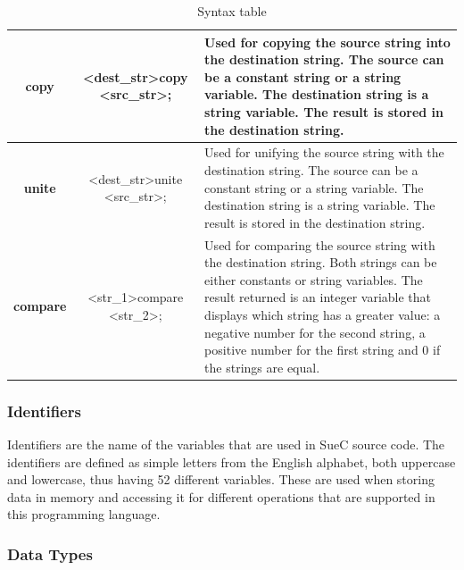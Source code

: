 \documentclass[12pt,a4paper,twoside]{report}
\begin{document}
\begin{table}[H]
\begin{tabular}{|c|c|p{8cm}|}
\textbf{copy}             & \textless{}dest\_str\textgreater copy \textless{}src\_str\textgreater{};                                                                                                  & Used for copying the source string into the destination string. The source can be a constant string or a string variable. The destination string is a string variable. The result is stored in the destination string.                                                                                                                 \\ \hline
\textbf{unite}            & \textless{}dest\_str\textgreater unite \textless{}src\_str\textgreater{};                                                                                                 & Used for unifying the source string with the destination string. The source can be a constant string or a string variable. The destination string is a string variable. The result is stored in the destination string.                                                                                                                \\ \hline
\textbf{compare}          & \textless{}str\_1\textgreater compare \textless{}str\_2\textgreater{};                                                                                                      & Used for comparing the source string with the destination string. Both strings can be either constants or string variables. The result returned is an integer variable that displays which string has a greater value: a negative number for the second string, a positive number for the first string and 0 if the strings are equal. \\ \hline
\end{tabular}
\caption{Syntax table}
\label{tab:my-table}
\end{table}

\subsubsection{Identifiers}

Identifiers are the name of the variables that are used in SueC source code. The identifiers are defined as simple letters from the English alphabet, both uppercase and lowercase, thus having 52 different variables. These are used when storing data in memory and accessing it for different operations that are supported in this programming language.

\subsubsection{Data Types}
\end{document}
